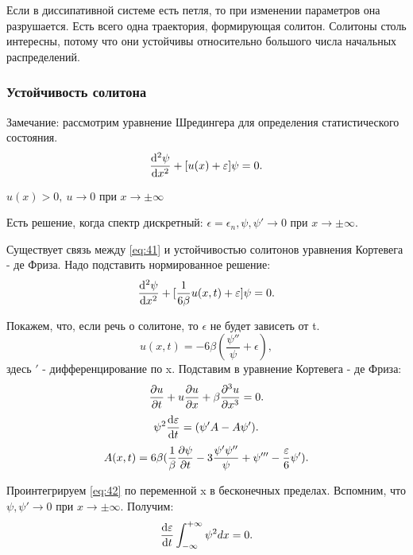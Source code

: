 Если в диссипативной системе есть петля, то при изменении параметров она разрушается. Есть всего одна траектория, формирующая солитон. Солитоны столь интересны, потому что они устойчивы относительно большого числа начальных распределений. 

\subsubsection{Устойчивость солитона}
Замечание: рассмотрим уравнение Шредингера для определения статистического состояния. 
\begin{equation}
	\dv[2]{\psi}{x}+[u(x)+\varepsilon]\psi=0.
	\label{eq::s310}
\end{equation}

$u(x)>0, ~u\rightarrow 0$ при $x\rightarrow \pm \infty$

Есть решение, когда спектр дискретный: $\epsilon=\epsilon_n, \psi, \psi' \rightarrow 0$ при $x\rightarrow \pm \infty$.\

Существует связь между \eqref{eq:41} и устойчивостью солитонов уравнения Кортевега - де Фриза. Надо подставить нормированное решение:
\begin{equation*}
	\dv[2]{\psi}{x}+[\frac{1}{6\beta}u(x,t)+\varepsilon]\psi=0.
\end{equation*}

Покажем, что, если речь о солитоне, то $\epsilon$ не будет зависеть от t.
\begin{equation*}
	u(x,t)=-6\beta(\frac{\psi''}{\psi}+\epsilon),
\end{equation*}
здесь $'$ - дифференцирование по x. Подставим в уравнение Кортевега - де Фриза:
\begin{equation*}
	\pdv{u}{t}+u\pdv{u}{x}+\beta \pdv[3]{u}{x}=0.
\end{equation*}
\begin{equation}
	\psi^2\dv{\varepsilon}{t}=(\psi'A-A\psi').
	\label{eq::s311}
\end{equation}
\begin{equation*}
	A(x,t)=6\beta(\frac1{\beta}\pdv{\psi}{t}-3\frac{\psi'\psi''}{\psi}+\psi'''-\frac{\varepsilon}{6}\psi').
\end{equation*}

Проинтегрируем \eqref{eq:42} по переменной x в бесконечных пределах. Вспомним, что $\psi, \psi' \rightarrow 0$ при $x\rightarrow \pm \infty$. Получим:
\begin{equation*}
	\dv{\varepsilon}{t}\int^{+\infty}_{-\infty}\psi^2dx=0.
\end{equation*}

